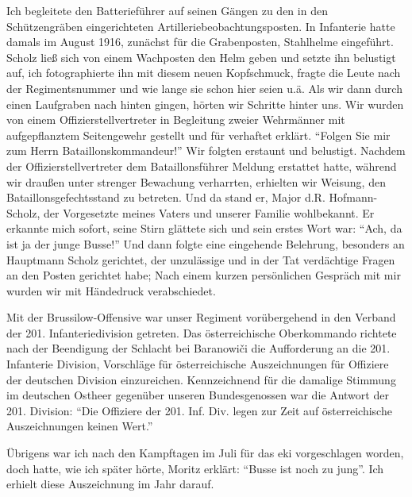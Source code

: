 Ich begleitete den Batterieführer auf seinen Gängen zu den in den Schützengräben eingerichteten Artilleriebeobachtungsposten. In Infanterie hatte damals im August 1916, zunächst für die Grabenposten, Stahlhelme eingeführt. Scholz ließ sich von einem Wachposten den Helm geben und setzte ihn belustigt auf, ich fotographierte ihn mit diesem neuen Kopfschmuck, fragte die Leute nach der Regimentsnummer und wie lange sie schon hier seien u.ä. Als wir dann durch einen Laufgraben nach hinten gingen, hörten wir Schritte hinter uns. Wir wurden von einem Offizierstellvertreter in Begleitung zweier Wehrmänner mit aufgepflanztem Seitengewehr gestellt und für verhaftet erklärt. \enquote{Folgen Sie mir zum Herrn Bataillonskommandeur!} Wir folgten erstaunt und belustigt. Nachdem der Offizierstellvertreter dem Bataillonsführer Meldung erstattet hatte, während wir draußen unter strenger Bewachung verharrten, erhielten wir Weisung, den Bataillonsgefechtsstand zu betreten. Und da stand er, Major d.R. Hofmann-Scholz, der Vorgesetzte meines Vaters und unserer Familie wohlbekannt. Er erkannte mich sofort, seine Stirn glättete sich und sein erstes Wort war: \enquote{Ach, da ist ja der junge Busse!} Und dann folgte eine eingehende Belehrung, besonders an Hauptmann Scholz gerichtet, der unzulässige und in der Tat verdächtige Fragen an den Posten gerichtet habe; Nach einem kurzen persönlichen Gespräch mit mir wurden wir mit Händedruck verabschiedet.

Mit der Brussilow-Offensive war unser Regiment vorübergehend in den Verband der 201. Infanteriedivision getreten. Das österreichische Oberkommando richtete nach der Beendigung der Schlacht bei Baranowiči die Aufforderung an die 201. Infanterie Division, Vorschläge für österreichische Auszeichnungen für Offiziere der deutschen Division einzureichen. Kennzeichnend für die damalige Stimmung im deutschen Ostheer gegenüber unseren Bundesgenossen war die Antwort der 201. Division: \enquote{Die Offiziere der 201. Inf. Div. legen zur Zeit auf österreichische Auszeichnungen keinen Wert.}

Übrigens war ich nach den Kampftagen im Juli für das \ac{eki} vorgeschlagen worden, doch hatte, wie ich später hörte, Moritz erklärt: \enquote{Busse ist noch zu jung}. Ich erhielt diese Auszeichnung im Jahr darauf.

